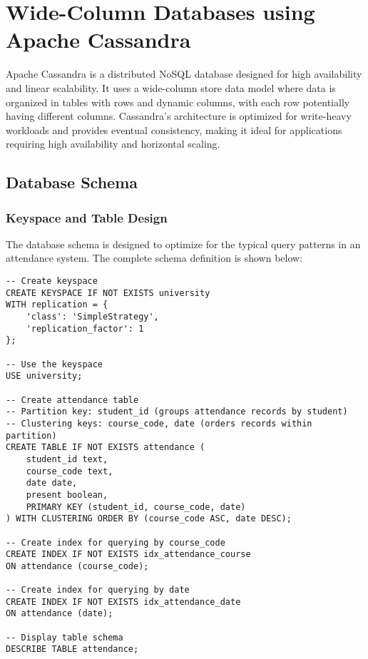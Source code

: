\chapter{Wide-Column Databases using Apache Cassandra}

Apache Cassandra is a distributed NoSQL database designed for high availability and linear scalability. It uses a wide-column store data model where data is organized in tables with rows and dynamic columns, with each row potentially having different columns. Cassandra's architecture is optimized for write-heavy workloads and provides eventual consistency, making it ideal for applications requiring high availability and horizontal scaling.

\section{Database Schema}

\subsection{Keyspace and Table Design}
The database schema is designed to optimize for the typical query patterns in an attendance system. The complete schema definition is shown below:

\begin{verbatim}
-- Create keyspace
CREATE KEYSPACE IF NOT EXISTS university
WITH replication = {
    'class': 'SimpleStrategy',
    'replication_factor': 1
};

-- Use the keyspace
USE university;

-- Create attendance table
-- Partition key: student_id (groups attendance records by student)
-- Clustering keys: course_code, date (orders records within partition)
CREATE TABLE IF NOT EXISTS attendance (
    student_id text,
    course_code text,
    date date,
    present boolean,
    PRIMARY KEY (student_id, course_code, date)
) WITH CLUSTERING ORDER BY (course_code ASC, date DESC);

-- Create index for querying by course_code
CREATE INDEX IF NOT EXISTS idx_attendance_course
ON attendance (course_code);

-- Create index for querying by date
CREATE INDEX IF NOT EXISTS idx_attendance_date
ON attendance (date);

-- Display table schema
DESCRIBE TABLE attendance;
\end{verbatim}

